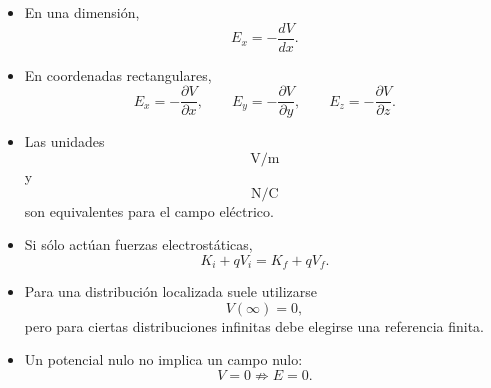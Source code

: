 \begin{resumen}
\begin{itemize}
    \item En una dimensión,
    \[
    \boxed{
    E_x=-\frac{dV}{dx}
    }.
    \]

    \item En coordenadas rectangulares,
    \[
    \boxed{
    E_x=-\frac{\partial V}{\partial x},
    \qquad
    E_y=-\frac{\partial V}{\partial y},
    \qquad
    E_z=-\frac{\partial V}{\partial z}
    }.
    \]

    \item Las unidades
    \[
    \boxed{\si{\volt\per\metre}}
    \]
    y
    \[
    \boxed{\si{\newton\per\coulomb}}
    \]
    son equivalentes para el campo eléctrico.

    \item Si sólo actúan fuerzas electrostáticas,
    \[
    \boxed{
    K_i+qV_i=K_f+qV_f
    }.
    \]

    \item Para una distribución localizada suele utilizarse
    \[
    \boxed{V(\infty)=0},
    \]
    pero para ciertas distribuciones infinitas debe elegirse una referencia finita.

    \item Un potencial nulo no implica un campo nulo:
    \[
    \boxed{V=0\not\Rightarrow E=0}.
    \]
\end{itemize}

\end{resumen}